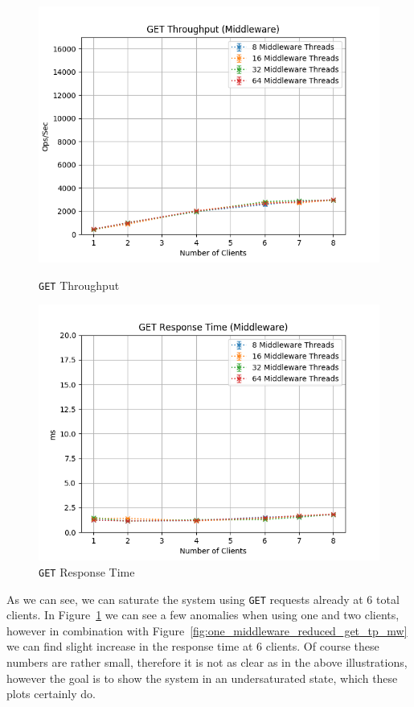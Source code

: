 \documentclass[11pt,a4paper]{article}
\begin{document}
\begin{figure}[H]
	\centering
	\captionsetup{width=0.4\textwidth}
    \begin{minipage}{0.5\textwidth}
        \centering
        \includegraphics[width=\textwidth]{../illustrations/plots/2_1_1_one_middleware_reduced/0-1/middleware_get_tp_s.png}
        \caption{\texttt{GET} Throughput}
        \label{fig:one_middleware_reduced_get_tp_mw}
    \end{minipage}\hfill
    \begin{minipage}{0.5\textwidth}
        \centering
        \includegraphics[width=\textwidth]{../illustrations/plots/2_1_1_one_middleware_reduced/0-1/middleware_get_rt_ms.png}
        \caption{\texttt{GET} Response Time}
        \label{fig:one_middleware_reduced_get_rt_mw}
    \end{minipage}
\end{figure}
%
As we can see, we can saturate the system using \texttt{GET} requests already at 6 total clients.
%
In Figure~\ref{fig:one_middleware_reduced_get_rt_mw} we can see a few anomalies when using one and two clients, however in combination with Figure~\ref{fig:one_middleware_reduced_get_tp_mw} we can find slight increase in the response time at 6 clients.
%
Of course these numbers are rather small, therefore it is not as clear as in the above illustrations, however the goal is to show the system in an undersaturated state, which these plots certainly do.
%
\end{document}
